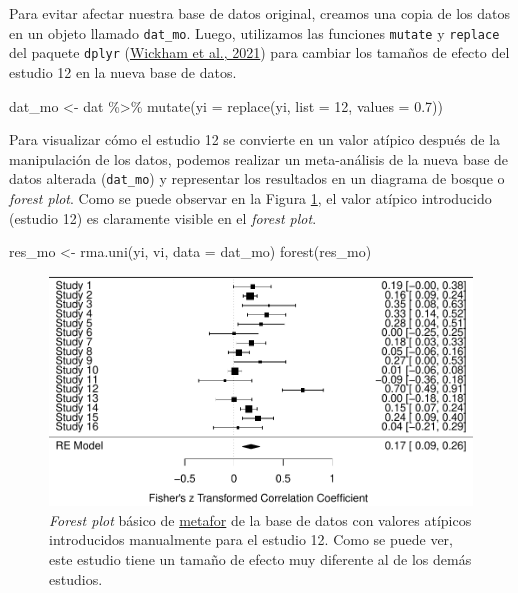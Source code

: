 \documentclass[
  bookmarksnumbered]{article}
\newenvironment{Shaded}{\begin{snugshade}}{\end{snugshade}}
\newcommand{\AttributeTok}[1]{\textcolor[rgb]{0.00,0.34,0.68}{#1}}
\newcommand{\DecValTok}[1]{\textcolor[rgb]{0.69,0.50,0.00}{#1}}
\newcommand{\FloatTok}[1]{\textcolor[rgb]{0.69,0.50,0.00}{#1}}
\newcommand{\FunctionTok}[1]{\textcolor[rgb]{0.39,0.29,0.61}{#1}}
\newcommand{\NormalTok}[1]{\textcolor[rgb]{0.12,0.11,0.11}{#1}}
\newcommand{\OtherTok}[1]{\textcolor[rgb]{0.00,0.43,0.16}{#1}}
\newcommand{\SpecialCharTok}[1]{\textcolor[rgb]{0.24,0.68,0.91}{#1}}
\begin{document}
Para evitar afectar nuestra base de datos original, creamos una copia de los datos en un objeto llamado \texttt{dat\_mo}. Luego, utilizamos las funciones \texttt{mutate} y \texttt{replace} del paquete \texttt{dplyr} (\protect\hyperlink{ref-WickhamDplyr2021}{Wickham et al., 2021}) para cambiar los tamaños de efecto del estudio 12 en la nueva base de datos.

\begin{Shaded}
\begin{Highlighting}[]
\NormalTok{dat\_mo }\OtherTok{\textless{}{-}}\NormalTok{ dat }\SpecialCharTok{\%\textgreater{}\%}
  \FunctionTok{mutate}\NormalTok{(}\AttributeTok{yi =} \FunctionTok{replace}\NormalTok{(yi, }\AttributeTok{list =} \DecValTok{12}\NormalTok{, }\AttributeTok{values =} \FloatTok{0.7}\NormalTok{))}
\end{Highlighting}
\end{Shaded}

Para visualizar cómo el estudio 12 se convierte en un valor atípico después de la manipulación de los datos, podemos realizar un meta-análisis de la nueva base de datos alterada (\texttt{dat\_mo}) y representar los resultados en un diagrama de bosque o \emph{forest plot}. Como se puede observar en la Figura \ref{fig:for-plot-mo}, el valor atípico introducido (estudio 12) es claramente visible en el \emph{forest plot}.

\begin{Shaded}
\begin{Highlighting}[]
\NormalTok{res\_mo }\OtherTok{\textless{}{-}} \FunctionTok{rma.uni}\NormalTok{(yi, vi, }\AttributeTok{data =}\NormalTok{ dat\_mo) }
\FunctionTok{forest}\NormalTok{(res\_mo)}
\end{Highlighting}
\end{Shaded}

\begin{figure}
\centering
\includegraphics{Meta-analysis_files/figure-latex/for-plot-mo-1.pdf}
\caption{\label{fig:for-plot-mo}\emph{Forest plot} básico de \href{https://www.metafor-project.org/doku.php}{metafor} de la base de datos con valores atípicos introducidos manualmente para el estudio 12. Como se puede ver, este estudio tiene un tamaño de efecto muy diferente al de los demás estudios.}
\end{figure}
\end{document}
